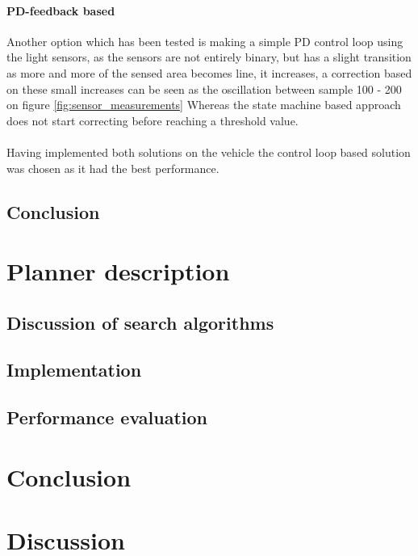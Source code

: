 \documentclass[draft, english, a4paper]{article}
\begin{document}
            \paragraph{PD-feedback based}
            Another option which has been tested is making a simple PD control loop
            using the light sensors, as the sensors are not entirely binary,
            but has a slight transition as more and more of the sensed area becomes
            line, it increases, a correction based on these small increases can 
            be seen as the oscillation between sample 100 - 200 on figure \ref{fig:sensor_measurements}
            Whereas the state machine based approach does not start correcting before reaching a threshold value.\\
            \\
            Having implemented both solutions on the vehicle the control loop based
            solution was chosen as it had the best performance.
	\subsection{Conclusion} %
\section{Planner description}
    
	\subsection{Discussion of search algorithms} %
		
	\subsection{Implementation}
	
	\subsection{Performance evaluation}
	
\section{Conclusion}
\section{Discussion}


\appendix
\end{document}
